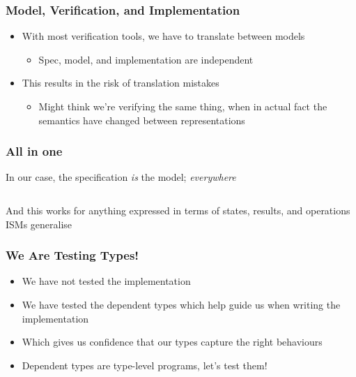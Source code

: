 \documentclass[compress,handout]{beamer}
\begin{document}
\begin{frame}
  \frametitle{Model, Verification, and Implementation}
  \begin{itemize}
    \item<1-> With most verification tools, we have to translate between models
    \begin{itemize}
      \item<1-> Spec, model, and implementation are independent
    \end{itemize}
    \item<2-> This results in the risk of translation mistakes
    \begin{itemize}
      \item<2-> Might think we're verifying the same thing, when in actual fact
                the semantics have changed between representations
    \end{itemize}
  \end{itemize}

\end{frame}


\begin{frame}[fragile]
  \frametitle{All in one}

  
  In our case, the specification \textit{is} the model; \textit{everywhere}

  \inputminted{Idris}{qc-things/ATM-arb-trace.idr}

  \pause

  And this works for anything expressed in terms of states, results, and
  operations {\textemdash} ISMs generalise

\end{frame}


\begin{frame}
  \frametitle{We Are Testing Types!}

  \begin{itemize}
    \item<1-> We have not tested the implementation
    \item<2-> We have tested the dependent types which help guide us when
              writing the implementation
    \item<3-> Which gives us confidence that our types capture the right
              behaviours
    \item<3-> Dependent types are type-level programs, let's test them!
  \end{itemize}

\end{frame}
\end{document}
